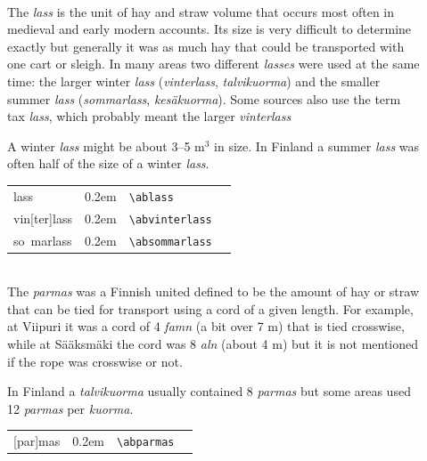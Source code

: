 \documentclass[a4paper]{article}
\newcommand{\samplefont}{\fontsize{16}{16}\abcursivefamily\spaceskip0.2em}
\newcommand{\sample}[1]{{\samplefont #1 \strut}}
\newcommand{\ltxncmd}[1]{\texttt{\textbackslash{}#1}}
\begin{document}
\begin{description}

\item [\sample{lass} \emph{lass}, \emph{kuorma}] \mbox{} \\
  The \emph{lass} is the unit of hay and straw volume that occurs most
  often in medieval and early modern accounts. Its size is very
  difficult to determine exactly but generally it was as much hay that
  could be transported with one cart or sleigh. In many areas two
  different \emph{lasses} were used at the same time: the larger
  winter \emph{lass} (\emph{vinterlass}, \emph{talvikuorma}) and the
  smaller summer \emph{lass} (\emph{sommarlass}, \emph{kesäkuorma}).
  Some sources also use the term tax \emph{lass}, which probably meant
  the larger \emph{vinterlass}

  A winter \emph{lass} might be about 3–5 m$^3$ in size. In Finland a
  summer \emph{lass} was often half of the size of a winter
  \emph{lass}.

  \begin{center}
    \begin{tabular}{llll}
      {}lass & \sample{\ablass} & \ltxncmd{ablass} \\
      {}vin[ter]lass & \sample{\abvinterlass} & \ltxncmd{abvinterlass} \\
      {}so~marlass & \sample{\absommarlass} & \ltxncmd{absommarlass} \\
    \end{tabular}
  \end{center}



\item [\sample{\abparmas}, \emph{parmas}] \mbox{} \\
  The \emph{parmas} was a Finnish united defined to be the amount of
  hay or straw that can be tied for transport using a cord of a given
  length. For example, at Viipuri it was a cord of 4 \emph{famn} (a
  bit over 7 m) that is tied crosswise, while at Sääksmäki the cord
  was 8 \emph{aln} (about 4 m) but it is not mentioned if the rope was
  crosswise or not.

  In Finland a \emph{talvikuorma} usually contained 8 \emph{parmas}
  but some areas used 12 \emph{parmas} per \emph{kuorma}. 
  \begin{center}
    \begin{tabular}{llll}
      {}[par]mas & \sample{\abparmas} & \ltxncmd{abparmas} \\
    \end{tabular}
  \end{center}



\end{description}
\end{document}
